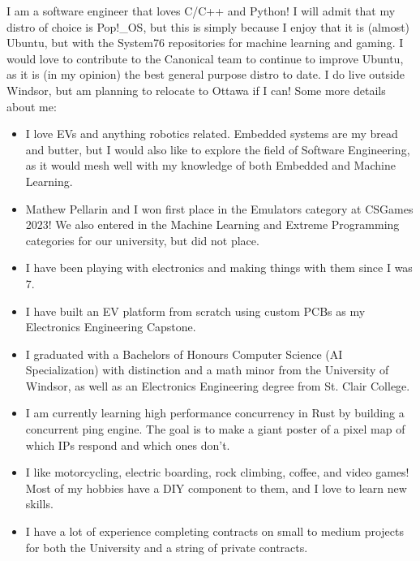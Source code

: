 I am a software engineer that loves C/C++ and Python! I will admit that my distro of choice is Pop!\_OS, but this is simply because I enjoy that it is (almost) Ubuntu, but with the System76 repositories for machine learning and gaming. I would love to contribute to the Canonical team to continue to improve Ubuntu, as it is (in my opinion) the best general purpose distro to date. I do live outside Windsor, but am planning to relocate to Ottawa if I can! Some more details about me:

\begin{itemize}
  \item I love EVs and anything robotics related. Embedded systems are my bread and butter, but I would also like to explore the field of Software Engineering, as it would mesh well with my knowledge of both Embedded and Machine Learning.
  \item Mathew Pellarin and I won first place in the Emulators category at CSGames 2023! We also entered in the Machine Learning and Extreme Programming categories for our university, but did not place.
  \item I have been playing with electronics and making things with them since I was 7.
  \item I have built an EV platform from scratch using custom PCBs as my Electronics Engineering Capstone.
  \item I graduated with a Bachelors of Honours Computer Science (AI Specialization) with distinction and a math minor from the University of Windsor, as well as an Electronics Engineering degree from St. Clair College.
  \item I am currently learning high performance concurrency in Rust by building a concurrent ping engine. The goal is to make a giant poster of a pixel map of which IPs respond and which ones don't.
  \item I like motorcycling, electric boarding, rock climbing, coffee, and video games! Most of my hobbies have a DIY component to them, and I love to learn new skills.
  \item I have a lot of experience completing contracts on small to medium projects for both the University and a string of private contracts.
\end{itemize}
